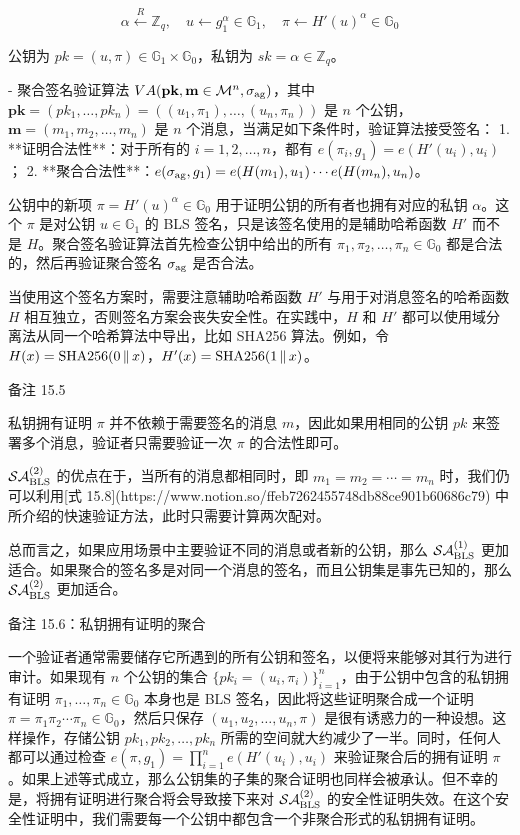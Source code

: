     \[
    \alpha \overset{R}\leftarrow \mathbb{Z}_q,
    \quad
    u\leftarrow g_1^\alpha\in\mathbb{G}_1,
    \quad
    \pi\leftarrow H'(u)^\alpha\in\mathbb{G}_0
    \]
    
    公钥为 $pk=(u,\pi)\in\mathbb{G}_1\times\mathbb{G}_0$，私钥为 $sk=\alpha\in\mathbb{Z}_q$。
    
- 聚合签名验证算法 $VA(\mathbf{pk},\mathbf{m}\in\mathcal{M}^n,\sigma_{\rm ag})$，其中 $\mathbf{pk}=(pk_1,\dots,pk_n)=((u_1,\pi_1),\dots,(u_n,\pi_n))$ 是 $n$ 个公钥，$\mathbf{m}=(m_1,m_2,\dots,m_n)$ 是 $n$ 个消息，当满足如下条件时，验证算法接受签名：
    1. **证明合法性**：对于所有的 $i=1,2,\dots,n$，都有 $e(\pi_i,g_1)=e(H'(u_i),u_i)$；
    2. **聚合合法性**：$e(\sigma_{\rm ag},g_1)=e(H(m_1),u_1)\cdots e(H(m_n),u_n)$。

公钥中的新项 $\pi=H'(u)^\alpha \in \mathbb{G}_0$ 用于证明公钥的所有者也拥有对应的私钥 $\alpha$。这个 $\pi$ 是对公钥 $u\in\mathbb{G}_1$ 的 BLS 签名，只是该签名使用的是辅助哈希函数 $H'$ 而不是 $H$。聚合签名验证算法首先检查公钥中给出的所有 $\pi_1,\pi_2,\dots,\pi_n\in\mathbb{G}_0$ 都是合法的，然后再验证聚合签名 $\sigma_{\rm ag}$ 是否合法。

当使用这个签名方案时，需要注意辅助哈希函数 $H'$ 与用于对消息签名的哈希函数 $H$ 相互独立，否则签名方案会丧失安全性。在实践中，$H$ 和 $H'$ 都可以使用域分离法从同一个哈希算法中导出，比如 SHA256 算法。例如，令 $H(x)={\rm SHA256}(0\,\Vert\,x)$，$H'(x)={\rm SHA256}(1\,\Vert\,x)$。

备注 15.5

私钥拥有证明 $\pi$ 并不依赖于需要签名的消息 $m$，因此如果用相同的公钥 $pk$ 来签署多个消息，验证者只需要验证一次 $\pi$ 的合法性即可。

$\mathcal{SA}_{\rm BLS}^{(2)}$ 的优点在于，当所有的消息都相同时，即 $m_1=m_2=\cdots=m_n$ 时，我们仍可以利用[式 15.8](https://www.notion.so/ffeb7262455748db88ce901b60686c79) 中所介绍的快速验证方法，此时只需要计算两次配对。

总而言之，如果应用场景中主要验证不同的消息或者新的公钥，那么 $\mathcal{SA}_{\rm BLS}^{(1)}$ 更加适合。如果聚合的签名多是对同一个消息的签名，而且公钥集是事先已知的，那么 $\mathcal{SA}_{\rm BLS}^{(2)}$ 更加适合。

备注 15.6：私钥拥有证明的聚合

一个验证者通常需要储存它所遇到的所有公钥和签名，以便将来能够对其行为进行审计。如果现有 $n$ 个公钥的集合 $\{pk_i=(u_i,\pi_i)\}_{i=1}^{n}$，由于公钥中包含的私钥拥有证明 $\pi_1,\dots,\pi_n\in\mathbb{G}_0$ 本身也是 BLS 签名，因此将这些证明聚合成一个证明 $\pi=\pi_1\pi_2\cdots\pi_n\in\mathbb{G}_0$，然后只保存 $(u_1,u_2,\dots,u_n,\pi)$ 是很有诱惑力的一种设想。这样操作，存储公钥 $pk_1,pk_2,\dots,pk_n$ 所需的空间就大约减少了一半。同时，任何人都可以通过检查 $e(\pi,g_1)=\prod_{i=1}^ne(H'(u_i),u_i)$ 来验证聚合后的拥有证明 $\pi$。如果上述等式成立，那么公钥集的子集的聚合证明也同样会被承认。但不幸的是，将拥有证明进行聚合将会导致接下来对 $\mathcal{SA}_{\rm BLS}^{(2)}$ 的安全性证明失效。在这个安全性证明中，我们需要每一个公钥中都包含一个非聚合形式的私钥拥有证明。

